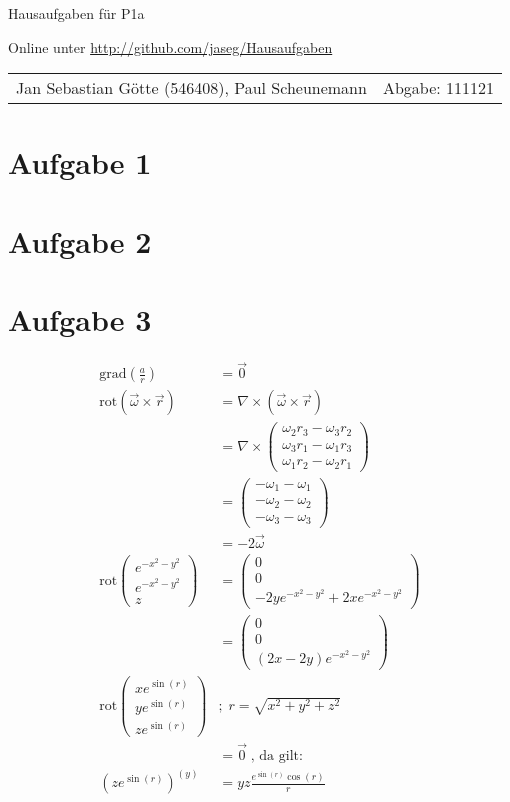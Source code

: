 \documentclass[12pt,a4paper,notitlepage]{article}
\newcommand{\grad}{\text{grad}}
\newcommand{\rot}{\text{rot}}
\newcommand{\aufgabe}[1]{\section*{\setcounter{section}{#1}Aufgabe #1}}
\begin{document}
\begin{center}
\Large Hausaufgaben für P1a

\normalsize Online unter \url{http://github.com/jaseg/Hausaufgaben}
\end{center}
\begin{tabularx}{\textwidth}{Xr}
Jan Sebastian Götte (546408), Paul Scheunemann&Abgabe: 111121
\end{tabularx}
\aufgabe{1}
\aufgabe{2}
\aufgabe{3}
\begin{align}
\grad\left(\frac{a}{r}\right)&=\vec 0\\
\rot(\vec\omega\times\vec r)&=\nabla\times(\vec\omega\times\vec r)\\
&=\nabla\times\left(\begin{matrix}
\omega_2r_3-\omega_3r_2\\
\omega_3r_1-\omega_1r_3\\
\omega_1r_2-\omega_2r_1
\end{matrix}\right)\\
&=\left(\begin{matrix}
-\omega_1-\omega_1\\
-\omega_2-\omega_2\\
-\omega_3-\omega_3
\end{matrix}\right)\\
&=-2\vec\omega\\
\rot\left(\begin{matrix}
e^{-x^2-y^2}\\
e^{-x^2-y^2}\\
z
\end{matrix}\right)&=\left(\begin{matrix}
0\\
0\\
-2ye^{-x^2-y^2}+2xe^{-x^2-y^2}
\end{matrix}\right)\\
&=\left(\begin{matrix}
0\\
0\\
(2x-2y)e^{-x^2-y^2}
\end{matrix}\right)\\
\rot\left(\begin{matrix}
xe^{\sin(r)}\\
ye^{\sin(r)}\\
ze^{\sin(r)}
\end{matrix}\right)&;\;r=\sqrt{x^2+y^2+z^2}\\
&=\vec 0\;\text{, da gilt: }\\
\left(ze^{\sin(r)}\right)^{(y)}&=yz\frac{e^{\sin(r)}\cos(r)}{r}
\end{align}
\end{document}
